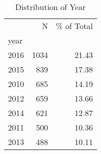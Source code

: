 \begin{table*}[htbp]
\centering
\small
\caption{Distribution of Year}
\label{tab:dist_year}
\begin{tabular}{lrr}
\toprule
 & N & \% of Total \\
year &  &  \\
\midrule
2016 & 1034 & 21.43 \\
2015 & 839 & 17.38 \\
2010 & 685 & 14.19 \\
2012 & 659 & 13.66 \\
2014 & 621 & 12.87 \\
2011 & 500 & 10.36 \\
2013 & 488 & 10.11 \\
\bottomrule
\end{tabular}
\end{table*}

